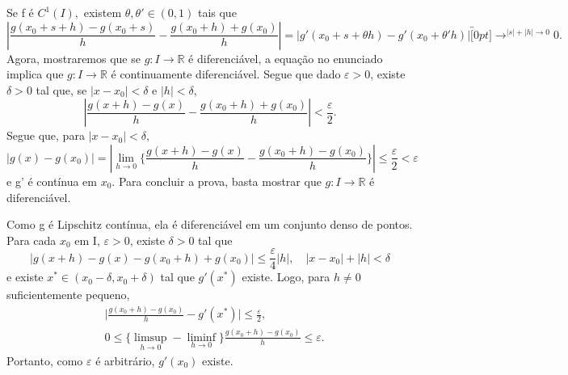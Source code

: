 \documentclass[analysis_notes.tex]{subfiles}
\begin{document}
\begin{proof*}
	Se f é \(C^{1}(I),\) existem \(\theta , \theta '\in(0, 1)\) tais que
	\[
		|\frac{g(x_{0}+s+h)-g(x_{0}+s)}{h}-\frac{g(x_{0}+h)+g(x_{0})}{h}| = |g'(x_{0}+s+\theta h)-g'(x_{0}+\theta 'h)|\overbracket[0pt]{\longrightarrow}^{|s|+|h|\to 0}0.
	\]
	Agora, mostraremos que se \(g:I\rightarrow \mathbb{R}\) é diferenciável, a equa\c cão
	no enunciado implica que \(g:I\rightarrow \mathbb{R}\) é continuamente diferenciável. Segue que
	dado \(\varepsilon >0\), existe \(\delta >0\) tal que, se \(|x-x_{0}| < \delta \) e \(|h| < \delta ,\)
	\[
		|\frac{g(x+h)-g(x)}{h}-\frac{g(x_{0}+h)+g(x_{0})}{h}| < \frac{\varepsilon }{2}.
	\]
	Segue que, para \(|x-x_{0}| < \delta ,\)
	\[
		|g(x)-g(x_{0})| = |\lim_{h\to 0}\biggl\{\frac{g(x+h)-g(x)}{h}-\frac{g(x_{0}+h)-g(x_{0})}{h}\biggr\}|\leq \frac{\varepsilon }{2} < \varepsilon
	\]
	e g' é contínua em \(x_{0}.\) Para concluir a prova, basta mostrar que \(g:I\rightarrow \mathbb{R}\) é diferenciável.

	Como g é Lipschitz contínua, ela é diferenciável em um conjunto denso de pontos.
	Para cada \(x_{0}\) em I, \(\varepsilon >0\), existe \(\delta >0\) tal que
	\[
		|g(x+h)-g(x)-g(x_{0}+h)+g(x_{0})|\leq \frac{\varepsilon }{4}|h|,\quad|x-x_{0}|+|h|<\delta
	\]
	e existe \(x^{*}\in(x_{0}-\delta ,x_{0}+\delta )\) tal que \(g'(x^{*})\) existe.
	Logo, para \(h\neq0\) suficientemente pequeno,
	\begin{align*}
		 & \biggl|\frac{g(x_{0}+h)-g(x_{0})}{h}-g'(x^{*})\biggr|\leq \frac{\varepsilon }{2},                      \\
		 & 0\leq \biggl\{\limsup_{h\to 0}-\liminf_{h\to 0}\biggr\}\frac{g(x_{0}+h)-g(x_{0})}{h}\leq \varepsilon .
	\end{align*}
	Portanto, como \(\varepsilon\) é arbitrário, \(g'(x_{0})\) existe. \qedsymbol
\end{proof*}
\end{document}
